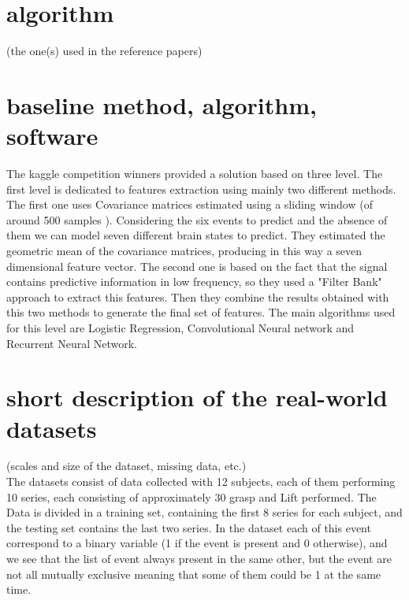 \documentclass[final,leqno,onefignum,onetabnum]{siamltexmm}
\begin{document}
\section{algorithm}
 (the one(s) used in the reference papers)

\section{baseline method, algorithm, software}
The kaggle competition winners \cite{kaggle} provided a solution based on three level. The first level is dedicated to features extraction using mainly two different methods. The first one uses Covariance matrices  estimated using a sliding window (of around 500 samples ). Considering the six events to predict and the absence of them we can model seven different brain states to predict. They estimated the geometric mean of the covariance matrices, producing in this way a seven dimensional feature vector. The second one is based on the fact that the signal contains predictive information in low frequency, so they used a  "Filter Bank" approach to extract this features. Then they combine the results obtained with this two methods to generate the final set of features. 
The main algorithms used for this level are Logistic Regression, Convolutional Neural network and Recurrent Neural Network. 
 

\section{short description of the real-world datasets}
(scales and size of the dataset, missing data, etc.)\\
The  datasets consist of data collected with 12 subjects, each of them performing 10 series, each consisting of approximately 30 grasp and Lift performed. The Data is divided in a  training set, containing the first 8 series for each subject, and  the testing set contains the last two series.
In the dataset each of this event correspond to a binary variable (1 if the event is present and 0 otherwise), and we see that the list of event always present in the same other, but the event are not all mutually exclusive meaning that some of  them could be 1 at the same time.  
 



\end{document}
